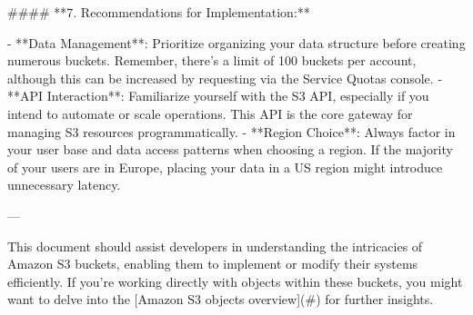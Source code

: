 #### **7. Recommendations for Implementation:**

- **Data Management**: Prioritize organizing your data structure before creating numerous buckets. Remember, there's a limit of 100 buckets per account, although this can be increased by requesting via the Service Quotas console.
- **API Interaction**: Familiarize yourself with the S3 API, especially if you intend to automate or scale operations. This API is the core gateway for managing S3 resources programmatically.
- **Region Choice**: Always factor in your user base and data access patterns when choosing a region. If the majority of your users are in Europe, placing your data in a US region might introduce unnecessary latency.

--- 

This document should assist developers in understanding the intricacies of Amazon S3 buckets, enabling them to implement or modify their systems efficiently. If you're working directly with objects within these buckets, you might want to delve into the [Amazon S3 objects overview](#) for further insights.